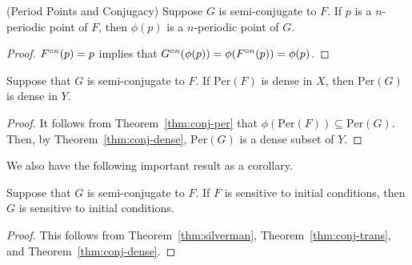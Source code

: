 \documentclass[12pt,draft,twoside]{book}
\begin{document}
  \begin{lemma}
    (Period Points and Conjugacy)
    Suppose $G$ is semi-conjugate to $F$.
    If $p$ is a $n$-periodic point of $F$, then $\phi(p)$ is a $n$-periodic point of $G$.
    \label{thm:conj-per}
    \begin{proof}
      $F^{\circ n}(p) = p$ implies that $G^{\circ n}(\phi(p)) = \phi(F^{\circ n}(p)) = \phi(p)$.
    \end{proof}
  \end{lemma}
\begin{theorem}
    Suppose that $G$ is semi-conjugate to $F$.
    If $\mathrm{Per}(F)$ is dense in $X$, then $\mathrm{Per}(G)$ is dense in $Y$.
    \label{cor:conj-dense-per}
    \begin{proof}
      It follows from Theorem~\ref{thm:conj-per} that $\phi(\mathrm{Per}(F)) \subseteq \mathrm{Per}(G)$.
      Then, by Theorem~\ref{thm:conj-dense}, $\mathrm{Per}(G)$ is a dense subset of $Y$.
    \end{proof}
\end{theorem}
We also have the following important result as a corollary.
\begin{corollary}
  Suppose that $G$ is semi-conjugate to $F$.
  If $F$ is sensitive to initial conditions, then $G$ is sensitive to initial conditions.
  \label{cor:conj-sdic}
  \begin{proof}
  This follows from Theorem~\ref{thm:silverman}, Theorem~\ref{thm:conj-trans}, and Theorem~\ref{thm:conj-dense}.
  \end{proof}
\end{corollary}





\printindex
\end{document}

